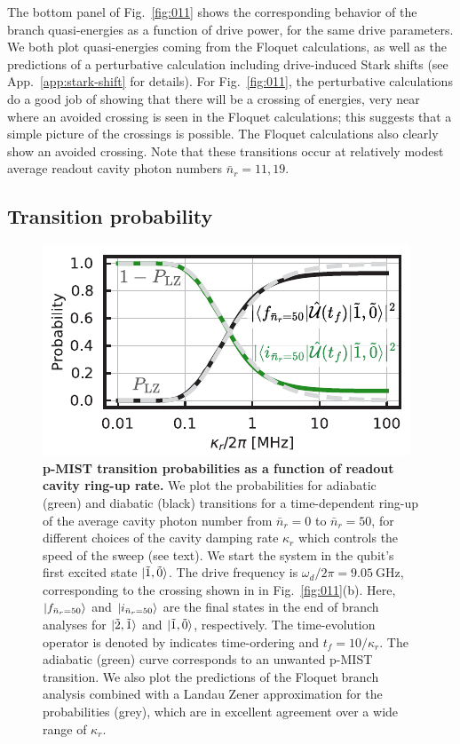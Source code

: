 \documentclass[%
reprint,
superscriptaddress,
 amsmath,amssymb,
 aps,
 prx,
longbibliography,
floatfix,
]{revtex4-2}
\newcommand{\singh}[1]{{\color{orange}{{}#1}}}%
\begin{document}
The bottom panel of Fig.~\ref{fig:011} shows the corresponding behavior of the branch quasi-energies as a function of drive power, for the same drive parameters.  We both plot quasi-energies coming from the Floquet calculations, as well as the predictions of a perturbative calculation including drive-induced Stark shifts (see App.~\ref{app:stark-shift} for details). For Fig.~\ref{fig:011}, the perturbative calculations do a good job of showing that there will be a crossing of energies, very near where an avoided crossing is seen in the Floquet calculations; this suggests that a simple picture of the crossings is possible. The Floquet calculations also clearly show an avoided crossing. Note that these transitions occur at relatively modest average readout cavity photon numbers $\bar n_r=11,19$. 


\subsection{Transition probability}\label{sec:LZ}
\begin{figure}[t]
    \centering
    \includegraphics[width=\linewidth]{Figures/LZ.pdf}
    \caption{
    {\bf p-MIST transition probabilities as a function of readout cavity ring-up rate.}
    We plot the probabilities for adiabatic (green) and diabatic (black) transitions for a time-dependent ring-up of the average cavity photon number from $\bar{n}_r = 0$ to $\bar{n}_r = 50$, for different choices of the cavity damping rate $\kappa_r$ which controls the speed of the sweep (see text).  We start the system in the qubit's first excited state $\ket{\tilde{1},\tilde{0}}$.  The drive frequency is $\omega_d/2\pi=9.05 \ \mathrm{GHz}$, corresponding to the crossing shown in in Fig.~\ref{fig:011}(b).
    Here, $\ket{f_{\bar n_r=50}}$ and $\ket{i_{\bar n_r=50}}$ are the final states in the end of branch analyses for $\ket{\tilde{2},\tilde{1}}$ and $\ket{\tilde{1},\tilde{0}}$, respectively. The time-evolution operator is denoted by \singh{$ \hat{\mathcal{U}}(t_f)=\mathcal{T}\exp\big(-i\int^{t_f}_{0} \hat H_{s.c.}(t)dt\big)$ where $\mathcal{T}$} indicates time-ordering and $t_f=10/\kappa_r$. The adiabatic (green) curve corresponds to an unwanted p-MIST transition.  We also plot the predictions of the Floquet branch analysis combined with a Landau Zener approximation for the probabilities (grey), which are in excellent agreement over a wide range of $\kappa_r$.}
    \label{fig:LZ}
\end{figure}
\end{document}
